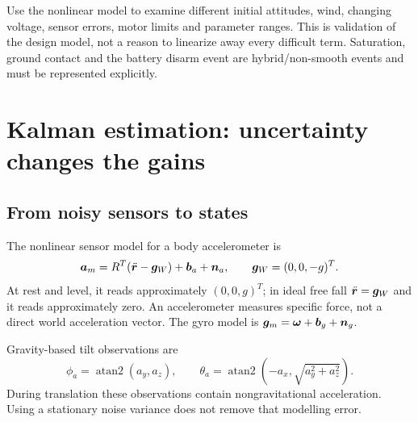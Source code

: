 Use the nonlinear model to examine different initial attitudes, wind, changing
voltage, sensor errors, motor limits and parameter ranges. This is validation of
the design model, not a reason to linearize away every difficult term.
Saturation, ground contact and the battery disarm event are hybrid/non-smooth
events and must be represented explicitly.

\chapter{Kalman estimation: uncertainty changes the gains}
\section{From noisy sensors to states}
The nonlinear sensor model for a body accelerometer is
\begin{equation}
\bm{a}_m=R^T(\ddot{\bm{r}}-\bm{g}_W)+\bm{b}_a+\bm{n}_a,\qquad
\bm{g}_W=(0,0,-g)^T.
\end{equation}
At rest and level, it reads approximately $(0,0,g)^T$; in ideal free fall
$\ddot{\bm{r}}=\bm{g}_W$ and it reads approximately zero. An accelerometer
measures specific force, not a direct world acceleration vector.
The gyro model is $\bm{g}_m=\bm{\omega}+\bm{b}_g+\bm{n}_g$.

Gravity-based tilt observations are
\begin{equation}
\phi_a=\operatorname{atan2}(a_y,a_z),\qquad
\theta_a=\operatorname{atan2}(-a_x,\sqrt{a_y^2+a_z^2}).
\end{equation}
During translation these observations contain nongravitational acceleration.
Using a stationary noise variance does not remove that modelling error.


